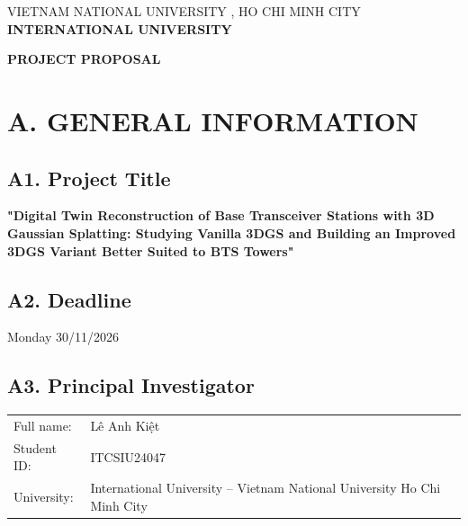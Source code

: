 \documentclass[a4paper,12pt]{article}
\begin{document}
\begin{minipage}[t]{0.68\textwidth}
\centering
\textsc{VIETNAM NATIONAL UNIVERSITY , HO CHI MINH CITY}\\
\textbf{INTERNATIONAL UNIVERSITY}
\end{minipage}
\hfill
\begin{minipage}[t]{0.28\textwidth}
\small

\end{minipage}

\vspace{0.6cm}
\begin{center}
{\LARGE\bfseries PROJECT PROPOSAL}\\[2pt]
\end{center}

\vspace{0.4cm}
\section*{A. GENERAL INFORMATION}
\vspace{-0.3cm}

\subsection*{A1. Project Title}
\begin{itemize}[leftmargin=1.2em]

\textbf{"Digital Twin Reconstruction of Base Transceiver Stations with 3D Gaussian Splatting: Studying Vanilla 3DGS and Building an Improved 3DGS Variant Better Suited to BTS Towers"}
\end{itemize}

\subsection*{A2. Deadline}
 Monday 30/11/2026

\subsection*{A3. Principal Investigator}
\begin{tabular}{@{}ll@{}}
Full name: & Lê Anh Kiệt \\
Student ID: & ITCSIU24047 \\
University: & International University -- Vietnam National University Ho Chi Minh City \\

\end{tabular}
\end{document}
